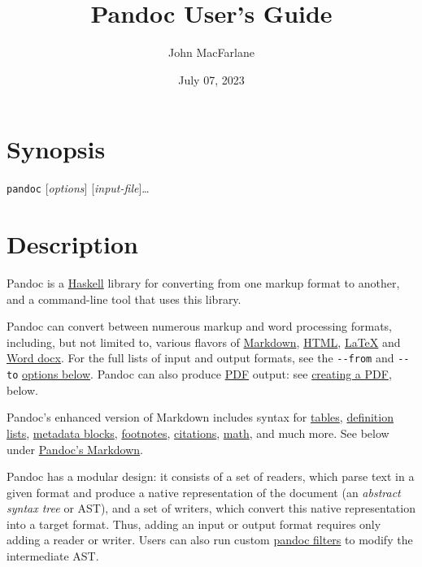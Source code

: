 \documentclass[
  a4paper,
]{article}
\title{Pandoc User's Guide}
\author{John MacFarlane}
\date{July 07, 2023}
\begin{document}
\maketitle

{
\hypersetup{linkcolor=}
\setcounter{tocdepth}{3}
\tableofcontents
}
\hypertarget{synopsis}{%
\section{Synopsis}\label{synopsis}}

\texttt{pandoc} {[}\emph{options}{]} {[}\emph{input-file}{]}\ldots{}

\hypertarget{description}{%
\section{Description}\label{description}}

Pandoc is a \href{https://www.haskell.org}{Haskell} library for
converting from one markup format to another, and a command-line tool
that uses this library.

Pandoc can convert between numerous markup and word processing formats,
including, but not limited to, various flavors of
\href{https://daringfireball.net/projects/markdown/}{Markdown},
\href{https://www.w3.org/html/}{HTML},
\href{https://www.latex-project.org/}{LaTeX} and
\href{https://en.wikipedia.org/wiki/Office_Open_XML}{Word docx}. For the
full lists of input and output formats, see the \texttt{-\/-from} and
\texttt{-\/-to} \protect\hyperlink{general-options}{options below}.
Pandoc can also produce \href{https://www.adobe.com/pdf/}{PDF} output:
see \protect\hyperlink{creating-a-pdf}{creating a PDF}, below.

Pandoc's enhanced version of Markdown includes syntax for
\protect\hyperlink{tables}{tables},
\protect\hyperlink{definition-lists}{definition lists},
\protect\hyperlink{metadata-blocks}{metadata blocks},
\protect\hyperlink{footnotes}{footnotes},
\protect\hyperlink{citations}{citations},
\protect\hyperlink{math}{math}, and much more. See below under
\protect\hyperlink{pandocs-markdown}{Pandoc's Markdown}.

Pandoc has a modular design: it consists of a set of readers, which
parse text in a given format and produce a native representation of the
document (an \emph{abstract syntax tree} or AST), and a set of writers,
which convert this native representation into a target format. Thus,
adding an input or output format requires only adding a reader or
writer. Users can also run custom
\href{https://pandoc.org/filters.html}{pandoc filters} to modify the
intermediate AST.
\end{document}
